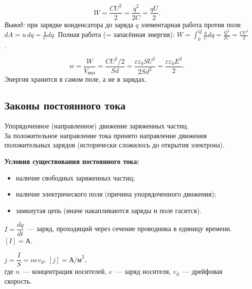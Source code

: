 \documentclass[12pt]{article}
\begin{document}
\begin{definition}
	\[
		W = \frac{CU^2}{2} = \frac{q^2}{2C} = \frac{qU}{2}.
	\]
	\textit{Вывод:} при зарядке конденсатора до заряда $q$ элементарная работа против поля: $dA = u\,dq = \frac{q}{C}dq$. Полная работа (= запасённая энергия): $W = \int_0^Q \frac{q}{C}dq = \frac{Q^2}{2C} = \frac{CU^2}{2}$.
\end{definition}

\begin{definition}
	\[
		w = \frac{W}{V_{\text{пол}}} = \frac{CU^2/2}{Sd} = \frac{\varepsilon\varepsilon_0 S U^2}{2Sd^2} = \frac{\varepsilon\varepsilon_0 E^2}{2}.
	\]
	Энергия хранится в самом поле, а не в зарядах.
\end{definition}

\subsection{Законы постоянного тока}

\begin{definition}
	Упорядоченное (направленное) движение заряженных частиц.\\
	За положительное направление тока принято направление движения положительных зарядов (исторически сложилось до открытия электрона).
\end{definition}

\textbf{Условия существования постоянного тока:}
\begin{itemize}
	\item наличие свободных заряженных частиц;
	\item наличие электрического поля (причина упорядоченного движения);
	\item замкнутая цепь (иначе накапливаются заряды и поле гасится).
\end{itemize}

\begin{definition}
	$I = \dfrac{dq}{dt}$~--- заряд, проходящий через сечение проводника в единицу времени. $[I] = \text{А}$.
\end{definition}

\begin{definition}
	$j = \dfrac{I}{S} = nev_d$, $[j] = \text{А/м}^2$,\\
	где $n$~--- концентрация носителей, $e$~--- заряд носителя, $v_d$~--- дрейфовая скорость.
\end{definition}
\end{document}
